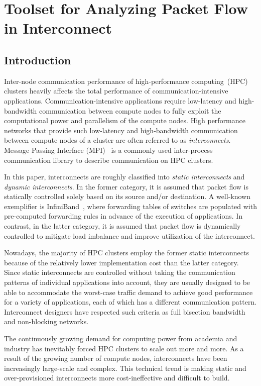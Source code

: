 \chapter{Toolset for Analyzing Packet Flow in Interconnect}\label{sec:ii}

\section{Introduction}\label{sec:ii-introduction}

Inter-node communication performance of high-performance computing~(HPC)
clusters heavily affects the total performance of
communication-intensive applications. Communication-intensive
applications require low-latency and high-bandwidth communication
between compute nodes to fully exploit the computational power and
parallelism of the compute nodes. High performance networks that
provide such low-latency and high-bandwidth communication between
compute nodes of a cluster are often referred to as
\emph{interconnects}. Message Passing Interface
(MPI)~\autocite{MessagePassingInterfaceForum2015,Gropp2014} is a
commonly used inter-process communication library to describe
communication on HPC clusters.

In this paper, interconnects are roughly classified into \emph{static
interconnects} and \emph{dynamic interconnects}. In the former category,
it is assumed that packet flow is statically controlled solely based on its
source and/or destination. A well-known exemplifier is
InfiniBand~\autocite{Buyya2009}, where forwarding tables of switches are
populated with pre-computed forwarding rules in advance of the execution of
applications. In contrast, in the latter category, it is assumed that packet
flow is dynamically controlled to mitigate load imbalance and improve
utilization of the interconnect.

Nowadays, the majority of HPC clusters employ the former static
interconnects because of the relatively lower implementation cost than the
latter category. Since static interconnects are controlled without taking the
communication patterns of individual applications into account, they are
usually designed to be able to accommodate the worst-case traffic demand to
achieve good performance for a variety of applications, each of which has a
different communication pattern. Interconnect designers have respected such
criteria as full bisection bandwidth and non-blocking networks.

The continuously growing demand for computing power from academia and
industry has inevitably forced HPC clusters to scale out more and more.
As a result of the growing number of compute nodes, interconnects
have been increasingly large-scale and complex. This technical trend is making
static and over-provisioned interconnects more cost-ineffective and
difficult to build.

